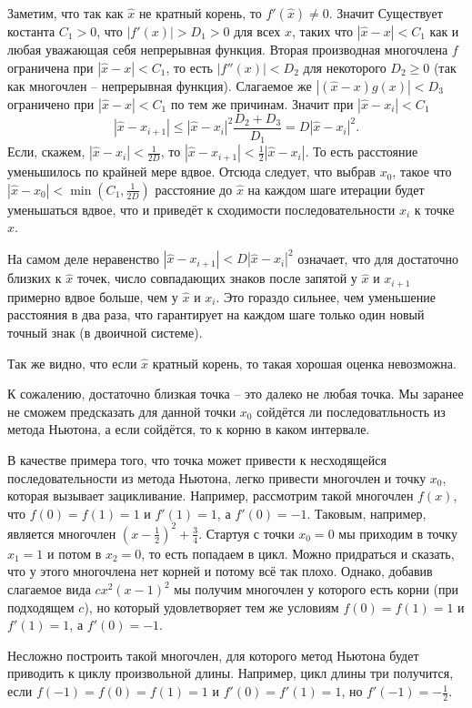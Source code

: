 Заметим, что так как $\hat{x}$ не кратный корень, то $f'(\hat{x})\neq 0$. Значит Существует костанта $C_1>0$, что  $|f'(x)|>D_1>0$ для всех $x$, таких что $|\hat{x}-x|<C_1$ как и любая уважающая себя непрерывная функция. Вторая производная многочлена $f$ ограничена при $|\hat{x}-x|<C_1$, то есть $|f''(x)|<D_2$ для некоторого $D_2 \geq 0$ (так как многочлен -- непрерывная функция). Слагаемое же $|(\hat{x}-x) g(x)|<D_3$  ограничено при $|\hat{x}-x|<C_1$ по тем же причинам. 
Значит при $|\hat{x}-x_i|<C_1$
$$|\hat{x}-x_{i+1}|\leq |\hat{x}-x_i|^2 \frac{D_2+D_3}{D_1}= D |\hat{x}-x_i|^2.$$
Если, скажем, $|\hat{x}-x_i|<\frac{1}{2D}$, то $|\hat{x}-x_{i+1}|<\frac{1}{2}|\hat{x}-x_i|$. То есть расстояние уменьшилось по крайней мере вдвое. Отсюда следует, что выбрав $x_0$, такое что $|\hat{x}-x_0|<\min (C_1,\frac{1}{2D})$ расстояние до $\hat{x}$ на каждом шаге итерации будет уменьшаться вдвое, что и приведёт к сходимости последовательности $x_i$ к точке $\hat{x}$.
\endproof

На самом деле неравенство $|\hat{x}-x_{i+1}|<D|\hat{x}-x_i|^2$ означает, что для достаточно близких к $\hat{x}$ точек, число совпадающих знаков после запятой у $\hat{x}$ и $x_{i+1}$ примерно вдвое больше, чем у $\hat{x}$ и $x_i$. Это гораздо сильнее, чем уменьшение расстояния в два раза, что гарантирует на каждом шаге только один новый точный знак (в двоичной системе).

Так же видно, что если $\hat{x}$ кратный корень, то такая хорошая оценка невозможна.

К сожалению, достаточно близкая точка -- это далеко не любая точка. Мы  заранее не сможем предсказать для данной точки $x_0$ сойдётся ли последоватльность из метода Ньютона, а если сойдётся, то к корню в каком интервале.

В качестве примера того, что точка может привести к несходящейся последовательности из метода Ньютона, легко привести многочлен и точку $x_0$, которая вызывает зацикливание. Например, рассмотрим такой многочлен $f(x)$, что $f(0)=f(1)=1$ и $f'(1)=1$, а $f'(0)=-1$. Таковым, например, является многочлен $(x-\frac{1}{2})^2+\frac{3}{4}$. Стартуя с точки $x_0=0$ мы приходим в точку $x_1=1$ и потом в $x_2=0$, то есть попадаем в цикл. Можно придраться и сказать, что у этого многочлена нет корней и потому всё так плохо. Однако, добавив слагаемое вида $c x^2(x-1)^2$ мы получим многочлен у которого есть корни (при подходящем $c$), но который удовлетворяет тем же условиям $f(0)=f(1)=1$ и $f'(1)=1$, а $f'(0)=-1$.

Несложно построить такой многочлен, для которого метод Ньютона будет приводить к циклу произвольной длины. Например, цикл длины три получится, если $f(-1)=f(0)=f(1)=1$ и $f'(0)=f'(1)=1$, но $f'(-1)=-\frac{1}{2}$.



